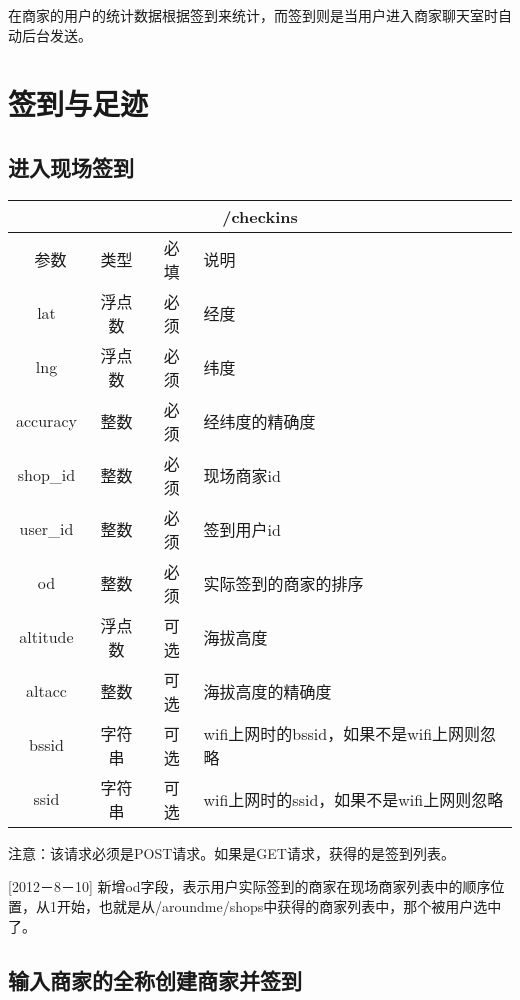 \documentclass[cs4size]{ctexartutf8}
\begin{document}
在商家的用户的统计数据根据签到来统计，而签到则是当用户进入商家聊天室时自动后台发送。



\section{签到与足迹}

\subsection{进入现场签到}

\begin{table}[H]
   \begin{center}
\begin{tabular}{|c|c|c|p{12cm}|}
\hline
\multicolumn{4}{|c|}{/checkins} \\
\hline\hline
 \  参数  & 类型 & 必填 &  说明  \\
\hline
 lat  & 浮点数 & 必须 & 经度\\
\hline
 lng  &  浮点数 & 必须 & 纬度\\ 
\hline
 accuracy  & 整数 & 必须 & 经纬度的精确度\\ 
\hline
 shop\_id  & 整数 & 必须 &  现场商家id\\ 
\hline
 user\_id  & 整数 & 必须 &  签到用户id\\ 
\hline
 od  & 整数 & 必须 &  实际签到的商家的排序\\  
\hline
 altitude  &  浮点数 & 可选 & 海拔高度\\ 
\hline
 altacc  & 整数 & 可选 & 海拔高度的精确度\\  
\hline
 bssid  & 字符串 & 可选 & wifi上网时的bssid，如果不是wifi上网则忽略\\  
\hline
 ssid  & 字符串 & 可选 & wifi上网时的ssid，如果不是wifi上网则忽略\\  
\hline
\end{tabular}
   \end{center}
\end{table}

注意：该请求必须是POST请求。如果是GET请求，获得的是签到列表。

[2012－8－10] 新增od字段，表示用户实际签到的商家在现场商家列表中的顺序位置，从1开始，也就是从/aroundme/shops中获得的商家列表中，那个被用户选中了。



\subsection{输入商家的全称创建商家并签到}
\end{document}
